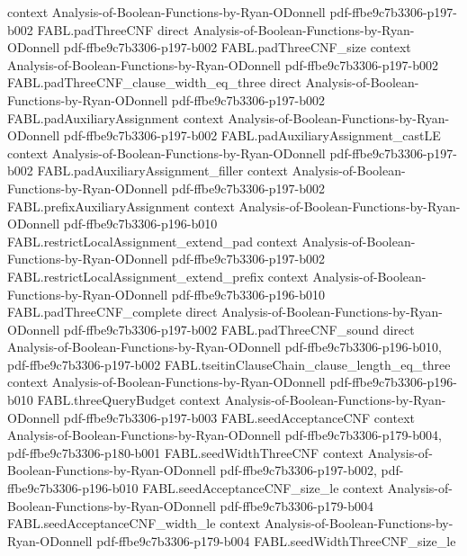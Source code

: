 \begin{theorem}
  {context}
  {Analysis-of-Boolean-Functions-by-Ryan-ODonnell}
  {pdf-ffbe9c7b3306-p197-b002}
\proofstep
  {FABL.padThreeCNF}
  {direct}
  {Analysis-of-Boolean-Functions-by-Ryan-ODonnell}
  {pdf-ffbe9c7b3306-p197-b002}
\proofstep
  {FABL.padThreeCNF_size}
  {context}
  {Analysis-of-Boolean-Functions-by-Ryan-ODonnell}
  {pdf-ffbe9c7b3306-p197-b002}
\proofstep
  {FABL.padThreeCNF_clause_width_eq_three}
  {direct}
  {Analysis-of-Boolean-Functions-by-Ryan-ODonnell}
  {pdf-ffbe9c7b3306-p197-b002}
\proofstep
  {FABL.padAuxiliaryAssignment}
  {context}
  {Analysis-of-Boolean-Functions-by-Ryan-ODonnell}
  {pdf-ffbe9c7b3306-p197-b002}
\proofstep
  {FABL.padAuxiliaryAssignment_castLE}
  {context}
  {Analysis-of-Boolean-Functions-by-Ryan-ODonnell}
  {pdf-ffbe9c7b3306-p197-b002}
\proofstep
  {FABL.padAuxiliaryAssignment_filler}
  {context}
  {Analysis-of-Boolean-Functions-by-Ryan-ODonnell}
  {pdf-ffbe9c7b3306-p197-b002}
\proofstep
  {FABL.prefixAuxiliaryAssignment}
  {context}
  {Analysis-of-Boolean-Functions-by-Ryan-ODonnell}
  {pdf-ffbe9c7b3306-p196-b010}
\proofstep
  {FABL.restrictLocalAssignment_extend_pad}
  {context}
  {Analysis-of-Boolean-Functions-by-Ryan-ODonnell}
  {pdf-ffbe9c7b3306-p197-b002}
\proofstep
  {FABL.restrictLocalAssignment_extend_prefix}
  {context}
  {Analysis-of-Boolean-Functions-by-Ryan-ODonnell}
  {pdf-ffbe9c7b3306-p196-b010}
\proofstep
  {FABL.padThreeCNF_complete}
  {direct}
  {Analysis-of-Boolean-Functions-by-Ryan-ODonnell}
  {pdf-ffbe9c7b3306-p197-b002}
\proofstep
  {FABL.padThreeCNF_sound}
  {direct}
  {Analysis-of-Boolean-Functions-by-Ryan-ODonnell}
  {pdf-ffbe9c7b3306-p196-b010,
    pdf-ffbe9c7b3306-p197-b002}
\proofstep
  {FABL.tseitinClauseChain_clause_length_eq_three}
  {context}
  {Analysis-of-Boolean-Functions-by-Ryan-ODonnell}
  {pdf-ffbe9c7b3306-p196-b010}
\proofstep
  {FABL.threeQueryBudget}
  {context}
  {Analysis-of-Boolean-Functions-by-Ryan-ODonnell}
  {pdf-ffbe9c7b3306-p197-b003}
\proofstep
  {FABL.seedAcceptanceCNF}
  {context}
  {Analysis-of-Boolean-Functions-by-Ryan-ODonnell}
  {pdf-ffbe9c7b3306-p179-b004,
    pdf-ffbe9c7b3306-p180-b001}
\proofstep
  {FABL.seedWidthThreeCNF}
  {context}
  {Analysis-of-Boolean-Functions-by-Ryan-ODonnell}
  {pdf-ffbe9c7b3306-p197-b002,
    pdf-ffbe9c7b3306-p196-b010}
\proofstep
  {FABL.seedAcceptanceCNF_size_le}
  {context}
  {Analysis-of-Boolean-Functions-by-Ryan-ODonnell}
  {pdf-ffbe9c7b3306-p179-b004}
\proofstep
  {FABL.seedAcceptanceCNF_width_le}
  {context}
  {Analysis-of-Boolean-Functions-by-Ryan-ODonnell}
  {pdf-ffbe9c7b3306-p179-b004}
\proofstep
  {FABL.seedWidthThreeCNF_size_le}

\end{theorem}
